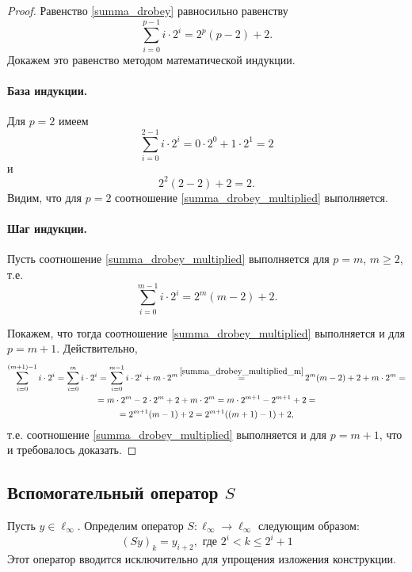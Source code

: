\begin{proof}
	Равенство \eqref{summa_drobey} равносильно равенству
	\begin{equation}\label{summa_drobey_multiplied}
		\sum_{i=0}^{p-1} i \cdot 2^i = 2^p(p-2) + 2
		.
	\end{equation}
	Докажем это равенство методом математической индукции.

	\paragraph{База индукции.}
	Для $p=2$ имеем
	\begin{equation}
		\sum_{i=0}^{2-1} i \cdot 2^i = 0 \cdot 2^0 + 1 \cdot 2^1 = 2
	\end{equation}
	и
	\begin{equation}
		2^2(2-2) + 2 = 2
		.
	\end{equation}
	Видим, что для $p=2$ соотношение \eqref{summa_drobey_multiplied} выполняется.

	\paragraph{Шаг индукции.}
	Пусть соотношение \eqref{summa_drobey_multiplied} выполняется для $p=m$, $m\geq 2$, т.е.
	\begin{equation}\label{summa_drobey_multiplied_m}
		\sum_{i=0}^{m-1} i \cdot 2^i = 2^m(m-2) + 2
		.
	\end{equation}

	Покажем, что тогда соотношение \eqref{summa_drobey_multiplied} выполняется и для $p=m+1$.
	Действительно,
	\begin{multline}
		\sum_{i=0}^{(m+1)-1} i \cdot 2^i
		=
		\sum_{i=0}^{m} i \cdot 2^i
		=
		\sum_{i=0}^{m - 1} i \cdot 2^i + m\cdot 2 ^m
		\mathop{=}^{\eqref{summa_drobey_multiplied_m}}
		2^m(m-2) + 2 + m\cdot 2 ^m
		=
		\\=
		m\cdot2^m-2\cdot2^m  + 2 + m\cdot 2 ^m
		=
		m\cdot2^{m+1}-2^{m+1}  + 2
		=
		\\=
		2^{m+1}(m-1)  + 2
		=
		2^{m+1}((m+1)-1)  + 2
		,
	\end{multline}
	т.е. соотношение \eqref{summa_drobey_multiplied} выполняется и для $p=m+1$,
	что и требовалось доказать.
\end{proof}


\subsection{Вспомогательный оператор $S$}
Пусть $y\in \ell_\infty$.
Определим оператор $S:\ell_\infty \to \ell_\infty$ следующим образом:
\begin{equation}\label{operator_S}
	(Sy)_k = y_{i+2}, \mbox{ где } 2^i < k \leq 2^i+1
\end{equation}
Этот оператор вводится исключительно для упрощения изложения конструкции.

